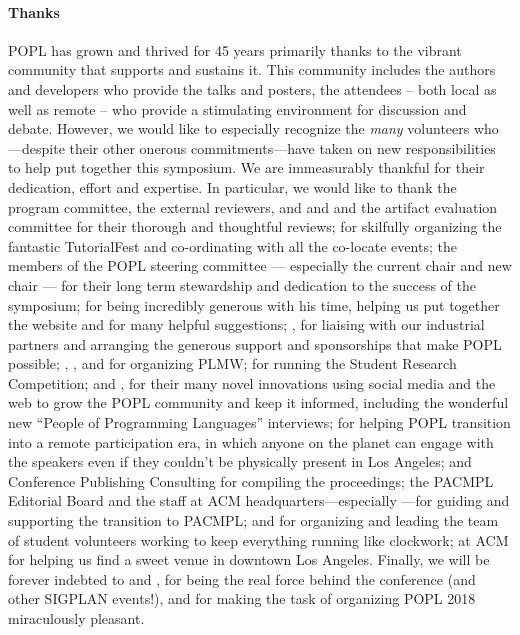\paragraph{Thanks}
%
POPL has grown and thrived for 45 years primarily thanks to
the vibrant community that supports and sustains it.
%
This community includes the authors and developers who
provide the talks and posters, the attendees -- both local
as well as remote -- who provide a stimulating environment
for discussion and debate.
%
However, we would like to especially recognize the \emph{many}
volunteers who---despite their other onerous commitments---have
taken on new responsibilities to help put together this symposium.
%
We are immeasurably thankful for their dedication, effort and expertise.
%
In particular, we would like to thank
%
the program committee, the external reviewers,
and  and 
and the artifact evaluation committee for their
thorough and thoughtful reviews;
%
 for skilfully organizing
the fantastic TutorialFest and co-ordinating with
all the co-locate events;
%
the members of the POPL steering committee --- especially the current
chair  and new chair  ---
for their long term stewardship and dedication to the success
of the symposium;
%
 for being incredibly generous with his time,
helping us put together the website and for many helpful
suggestions;
%
, for liaising with our industrial
partners and arranging the generous support and
sponsorships that make POPL possible;
%
, ,
 and 
for organizing PLMW;
%
 for running the Student Research Competition;
%
 and , for their many novel innovations
using social media and the web to grow the POPL community and
keep it informed, including the wonderful new ``People of Programming Languages''
interviews;
%
 for helping POPL transition into a remote participation
era, in which anyone on the planet can engage with the speakers even
if they couldn't be physically present in Los Angeles;
%
%
 and Conference Publishing Consulting
for compiling the proceedings;
%
the PACMPL Editorial Board and the staff at ACM
headquarters---especially ---for guiding
and supporting the transition to PACMPL;
%
 and  for organizing
and leading the team of student volunteers
working to keep everything running like clockwork;
%
 at ACM for helping us find a sweet
venue in downtown Los Angeles.
%
Finally, we will be forever indebted to
 and ,
for being the real force behind the conference
(and other SIGPLAN events!), and for making the
task of organizing POPL 2018 miraculously pleasant.


